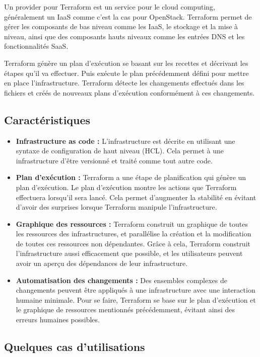 \documentclass[]{article}
\begin{document}
Un provider pour Terraform est un service pour le cloud computing, généralement un
IaaS comme c'est la cas pour OpenStack. 
Terraform permet de gérer les composants de bas niveau comme les IaaS,
le stockage et la mise à niveau, ainsi que des composants hauts niveaux
comme les entrées DNS et les fonctionnalités SaaS.

Terraform génère un plan d'exécution se basant sur les recettes et
décrivant les étapes qu'il va effectuer. Puis exécute le plan
précédemment défini pour mettre en place l'infrastructure. Terraform
détecte les changements effectués dans les fichiers et créés de nouveaux
plans d'exécution conformément à ces changements.

\subsection{Caractéristiques}\label{caractuxe9ristiques}
\begin{itemize}
\item
  \textbf{Infrastructure as code :} L'infrastructure est décrite en
  utilisant une syntaxe de configuration de haut niveau (HCL). Cela
  permet à une infrastructure d'être versionné et traité comme tout autre
  code.
\item
  \textbf{Plan d'exécution :} Terraform a une étape de \og
  planification \fg qui génère un plan d'exécution. Le
  plan d'exécution montre les actions que Terraform effectuera lorsqu'il
  sera lancé. Cela permet d'augmenter la stabilité en évitant d'avoir des
  surprises lorsque Terraform manipule l'infrastructure.
\item
  \textbf{Graphique des ressources :} Terraform construit un graphique de
  toutes les ressources des infrastructures, et parallélise la création
  et la modification de toutes ces ressources non dépendantes. Grâce à
  cela, Terraform construit l'infrastructure aussi efficacement que
  possible, et les utilisateurs peuvent avoir un aperçu des dépendances
  de leur infrastructure.
\item
  \textbf{Automatisation des changements :} Des ensembles complexes de
  changements peuvent être appliqués à une infrastructure avec une
  interaction humaine minimale. Pour se faire, Terraform se base sur le
  plan d'exécution et le graphique de ressources mentionnés
  précédemment, évitant ainsi des erreurs humaines possibles.
\end{itemize}

\subsection{Quelques cas d'utilisations}\label{quelques-cas-dutilisations}
\end{document}
